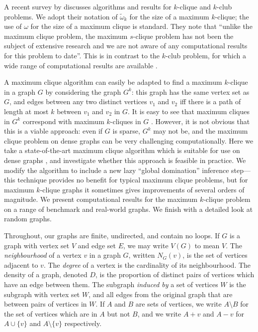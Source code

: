 \documentclass[letterpaper]{article}
\newcommand{\vertexset}{V}
\newcommand{\neighbourhood}{N}
\begin{document}
A recent survey by \citeauthor{Shahinpour:2013}  discusses algorithms and
results for $k$-clique and $k$-club problems.  We adopt their notation of $\tilde{\omega}_k$ for
the size of a maximum $k$-clique; the use of $\omega$ for the size of a maximum clique is standard.
They note that ``unlike the maximum clique problem, the maximum $s$-clique problem has not been the
subject of extensive research and we are not aware of any computational results for this problem to
date''. This is in contrast to the $k$-club problem, for which a wide range of computational results
are available
\cite{Bourjolly:2000,Bourjolly:2002,Mahdavi:2012,Hartung:2012,Chang:2013,Shahinpour:2013,Wotzlaw:2014,Picker:2015,Carvalho:2016}.

A maximum clique algorithm can easily be adapted to find a maximum $k$-clique in a graph $G$ by
considering the graph $G^k$: this graph has the same vertex set as $G$, and edges between any two
distinct vertices $v_1$ and $v_2$ iff there is a path of length at most $k$ between $v_1$ and $v_2$
in $G$. It is easy to see that maximum cliques in $G^k$ correspond with maximum $k$-cliques in $G$
\cite{Balasundaram:2005}.  However, it is not obvious that this is a viable approach: even if $G$ is
sparse, $G^k$ may not be, and the maximum clique problem on dense graphs can be very challenging
computationally. Here we take a state-of-the-art maximum clique algorithm which is suitable for use
on dense graphs \cite{Prosser:2012}, and investigate whether this approach is feasible in practice.
We modify the algorithm to include a new lazy ``global domination'' inference step---this technique
provides no benefit for typical maximum clique problems, but for maximum $k$-clique graphs it
sometimes gives improvements of several orders of magnitude. We present computational results for
the maximum $k$-clique problem on a range of benchmark and real-world graphs. We finish with a
detailed look at random graphs.

Throughout, our graphs are finite, undirected, and contain no loops. If $G$ is a graph with vertex
set $V$ and edge set $E$, we may write $\vertexset(G)$ to mean $V$. The \emph{neighbourhood} of a
vertex $v$ in a graph $G$, written $\neighbourhood_G(v)$, is the set of vertices adjacent to $v$.
The \emph{degree} of a vertex is the cardinality of its neighbourhood. The density of a graph,
denoted $D$, is the proportion of distinct pairs of vertices which have an edge between them. The
subgraph \emph{induced by} a set of vertices $W$ is the subgraph with vertex set $W$, and all edges
from the original graph that are between pairs of vertices in $W$. If $A$ and $B$ are sets of
vertices, we write $A \setminus B$ for the set of vertices which are in $A$ but not $B$, and we
write $A + v$ and $A - v$ for $A \cup \{v\}$ and $A \setminus \{v\}$ respectively.
\end{document}
